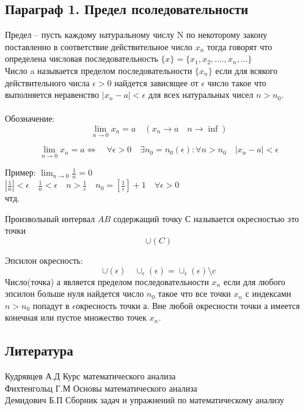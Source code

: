 \documentclass[a4paper, 12pt]{article}
\begin{document}
\subsection{Параграф 1. Предел псоледовательности}
Предел -- пусть каждому натуральному числу N по некоторому закону поставленно в соответствие действительное число $ x_n $ тогда говорят что определена числовая последовательность $ \{x\} = \{x_1,x_2,....,x_n,...\} $ \\
Число a называется пределом последовательности $ \{x_n\}  $ если для всякого действительного числа $ \epsilon  > 0$ найдется зависящее от $ \epsilon $ число такое что выполняется неравенство $ |x_n - a| < \epsilon  $ для всех натуральных чисел $ n > n_0 $.  \\
\\Обозначение:\\
\[
	\lim_{n\to 0} x_n  = a \quad(x_n \to a \quad n \to \inf)	
\]
 
 \[
 	\lim_{n\to 0} x_n = a \Leftrightarrow  \quad \forall \epsilon > 0 \quad \exists n_0 = n_0(\epsilon): \forall n > n_0 \quad |x_n -a| < \epsilon
 \]
\begin{mdframed}[backgroundcolor=blue!20] 
       Пример: $  \lim_{n\to 0} \frac{1}{n}=0 $\\
       $|\frac{1}{n}| < \epsilon \quad \frac{1}{n} < \epsilon \quad n > \frac{1}{\epsilon} \quad n_0 = \left[\frac{1}{\epsilon}\right] + 1 \quad \forall \epsilon>0 $\\
       чтд.
    \end{mdframed}
Произвольный интервал $ AB $ содержащий точку С называется окресностью это точки\\
\[
	\cup(C)	
\]

Эпсилон окресность:\\
\[
	\cup(\epsilon)	\quad {\cup_\epsilon}(\epsilon) = \cup_\epsilon(\epsilon) \setminus {c}
\]
Число(точка) а является пределом последовательности $ x_n $
если для любого эпсилон больше нуля найдется число $ n_0 $ такое что все точки $ x_n $ с индексами $  n > n_0$ попадут в $ \epsilon $окресность точки а. Вне любой окресности точки а имеется конечная или пустое множество точек $ x_n $.



\subsection*{Литература}
Кудрявцев А.Д Курс математического анализа\\
Фихтенгольц Г.М Основы математического анализа\\
Демидович Б.П Сборник задач и упражнений по математическому анализу\\
\end{document}
